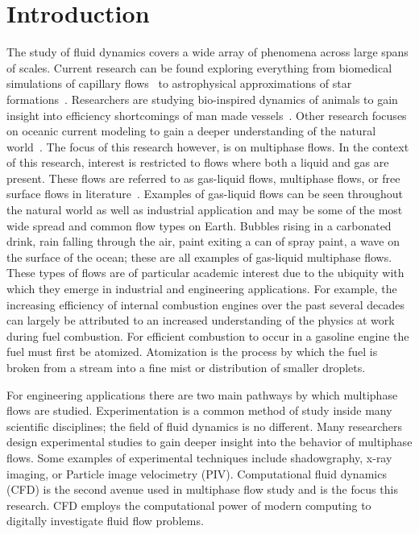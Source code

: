 \chapter{Introduction}\label{CH:introduction}


The study of fluid dynamics covers a wide array of phenomena across large spans of scales. Current research can be found exploring everything from biomedical simulations of capillary flows~\cite{1} to astrophysical approximations of star formations~\cite{1}. Researchers are studying bio-inspired dynamics of animals to gain insight into efficiency shortcomings of man made vessels~\cite{1}. Other research focuses on oceanic current modeling to gain a deeper understanding of the natural world~\cite{1}. The focus of this research however, is on multiphase flows. In the context of this research, interest is restricted to flows where both a liquid and gas are present. These flows are referred to as gas-liquid flows, multiphase flows, or free surface flows in literature~\cite{1,2,3}. Examples of gas-liquid flows can be seen throughout the natural world as well as industrial application and may be some of the most wide spread and common flow types on Earth. Bubbles rising in a carbonated drink, rain falling through the air, paint exiting a can of spray paint, a wave on the surface of the ocean; these are all examples of gas-liquid multiphase flows. These types of flows are of particular academic interest due to the ubiquity with which they emerge in industrial and engineering applications. For example, the increasing efficiency of internal combustion engines over the past several decades can largely be attributed to an increased understanding of the physics at work during fuel combustion. For efficient combustion to occur in a gasoline engine the fuel must first be atomized. Atomization is the process by which the fuel is broken from a stream into a fine mist or distribution of smaller droplets.


For engineering applications there are two main pathways by which multiphase flows are studied. Experimentation is a common method of study inside many scientific disciplines; the field of fluid dynamics is no different. Many researchers design experimental studies to gain deeper insight into the behavior of multiphase flows. Some examples of experimental techniques include shadowgraphy, x-ray imaging, or Particle image velocimetry (PIV). Computational fluid dynamics (CFD) is the second avenue used in multiphase flow study and is the focus this research.  CFD employs the computational power of modern computing to digitally investigate fluid flow problems. 


